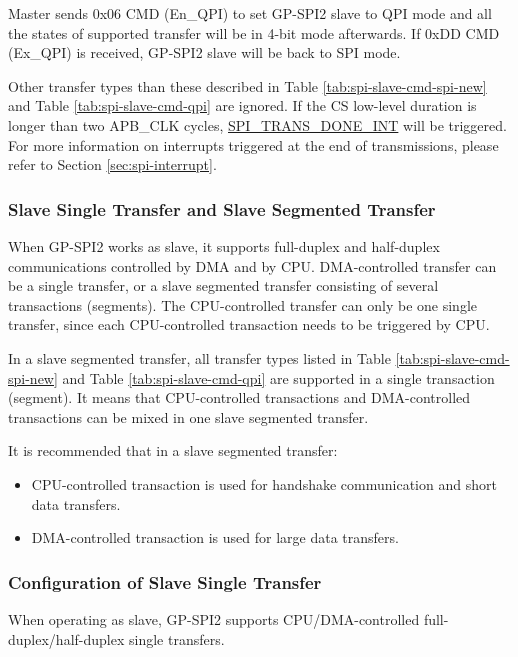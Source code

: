\documentclass[main\_\_EN.tex]{subfiles}
\begin{document}
Master sends 0x06 CMD (En\_QPI) to set GP-SPI2 slave to QPI mode and all the states of supported transfer will be in 4-bit mode afterwards. If 0xDD CMD (Ex\_QPI) is received, GP-SPI2 slave will be back to SPI mode. 

Other transfer types than these described in Table \ref{tab:spi-slave-cmd-spi-new} and Table \ref{tab:spi-slave-cmd-qpi} are ignored.
If the CS low-level duration is longer than two APB\_CLK cycles, \hyperref[int:SPITRANSDONEINT]{SPI\_TRANS\_DONE\_INT} will be triggered. For more information on interrupts triggered at the end of transmissions, please refer to Section \ref{sec:spi-interrupt}.

\subsubsection{Slave Single Transfer and Slave Segmented Transfer}\label{sec:gp-spi2-slave-seg-trans}

When GP-SPI2 works as slave, it supports full-duplex and half-duplex communications controlled by DMA and by CPU. DMA-controlled transfer can be a single transfer, or a slave segmented transfer consisting of several transactions (segments). The CPU-controlled transfer can only be one single transfer, since each CPU-controlled transaction needs to be triggered by CPU.

In a slave segmented transfer, all transfer types listed in Table \ref{tab:spi-slave-cmd-spi-new} and Table \ref{tab:spi-slave-cmd-qpi} are supported in a single transaction (segment). It means that CPU-controlled transactions and DMA-controlled transactions can be mixed in one slave segmented transfer. 

It is recommended that in a slave segmented transfer:

\begin{itemize}
    \item CPU-controlled transaction is used for handshake communication and short data transfers.
    \item DMA-controlled transaction is used for large data transfers.
\end{itemize}


\subsubsection{Configuration of Slave Single Transfer}\label{sec:gp-spi2-slave-single-transfer}

When operating as slave, GP-SPI2 supports CPU/DMA-controlled full-duplex/half-duplex single transfers.
\end{document}
